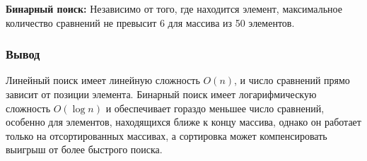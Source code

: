 \textbf{Бинарный поиск:}
Независимо от того, где находится элемент, максимальное количество сравнений не превысит 6 для массива из 50 элементов.

\subsubsection*{Вывод}

\hspace{1.25cm}
Линейный поиск имеет линейную сложность \(O(n)\), и число сравнений прямо зависит от позиции элемента. Бинарный поиск имеет логарифмическую сложность \(O(\log n)\) и обеспечивает гораздо меньшее число сравнений, особенно для элементов, находящихся ближе к концу массива, однако он работает только на отсортированных массивах, а сортировка может компенсировать выигрыш от более быстрого поиска.

\newpage